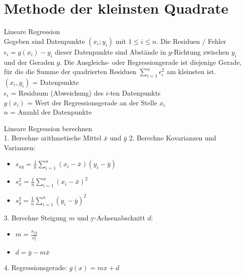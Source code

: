 \section{Methode der kleinsten Quadrate}
\begin{definition}{Lineare Regression}\\
Gegeben sind Datenpunkte $(x_i; y_i)$ mit $1 \leq i \leq n$. Die Residuen / Fehler $\epsilon_i=g(x_i)-y_i$ dieser Datenpunkte sind Abstände in $y$-Richtung zwischen $y_i$ und der Geraden $g$. Die Ausgleichs- oder Regressiongerade ist diejenige Gerade, für die die Summe der quadrierten Residuen $\sum_{i=1}^{n} \epsilon_i^2$ am kleinsten ist.\\
$(x_i, y_i)$ = Datenpunkte\\
$\epsilon_i$ = Residuum (Abweichung) des $i$-ten Datenpunkts\\
$g(x_i)$ = Wert der Regressionsgerade an der Stelle $x_i$\\
$n$ = Anzahl der Datenpunkte\\
\end{definition}

\begin{KR}{Lineare Regression berechnen}\\
1. Berechne arithmetische Mittel $\bar{x}$ und $\bar{y}$
2. Berechne Kovarianzen und Varianzen:
   \begin{itemize}
     \item $s_{xy} = \frac{1}{n}\sum_{i=1}^n (x_i-\bar{x})(y_i-\bar{y})$
     \item $s_x^2 = \frac{1}{n}\sum_{i=1}^n (x_i-\bar{x})^2$
     \item $s_y^2 = \frac{1}{n}\sum_{i=1}^n (y_i-\bar{y})^2$
   \end{itemize}
3. Berechne Steigung $m$ und y-Achsenabschnitt $d$:
   \begin{itemize}
     \item $m = \frac{s_{xy}}{s_x^2}$
     \item $d = \bar{y} - m\bar{x}$
   \end{itemize}
4. Regressionsgerade: $g(x) = mx + d$
\end{KR}


